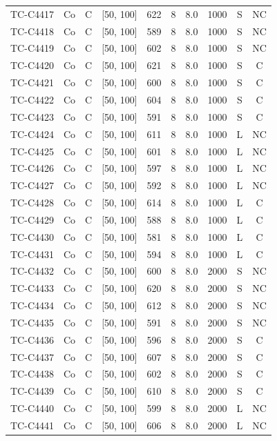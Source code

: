 \begin{longtable}{lccccccccc}
TC-C4417 & Co & C & [50, 100] & 622 & 8 & 8.0 & 1000 & S & NC \\
TC-C4418 & Co & C & [50, 100] & 589 & 8 & 8.0 & 1000 & S & NC \\
TC-C4419 & Co & C & [50, 100] & 602 & 8 & 8.0 & 1000 & S & NC \\
TC-C4420 & Co & C & [50, 100] & 621 & 8 & 8.0 & 1000 & S & C \\
TC-C4421 & Co & C & [50, 100] & 600 & 8 & 8.0 & 1000 & S & C \\
TC-C4422 & Co & C & [50, 100] & 604 & 8 & 8.0 & 1000 & S & C \\
TC-C4423 & Co & C & [50, 100] & 591 & 8 & 8.0 & 1000 & S & C \\
TC-C4424 & Co & C & [50, 100] & 611 & 8 & 8.0 & 1000 & L & NC \\
TC-C4425 & Co & C & [50, 100] & 601 & 8 & 8.0 & 1000 & L & NC \\
TC-C4426 & Co & C & [50, 100] & 597 & 8 & 8.0 & 1000 & L & NC \\
TC-C4427 & Co & C & [50, 100] & 592 & 8 & 8.0 & 1000 & L & NC \\
TC-C4428 & Co & C & [50, 100] & 614 & 8 & 8.0 & 1000 & L & C \\
TC-C4429 & Co & C & [50, 100] & 588 & 8 & 8.0 & 1000 & L & C \\
TC-C4430 & Co & C & [50, 100] & 581 & 8 & 8.0 & 1000 & L & C \\
TC-C4431 & Co & C & [50, 100] & 594 & 8 & 8.0 & 1000 & L & C \\
TC-C4432 & Co & C & [50, 100] & 600 & 8 & 8.0 & 2000 & S & NC \\
TC-C4433 & Co & C & [50, 100] & 620 & 8 & 8.0 & 2000 & S & NC \\
TC-C4434 & Co & C & [50, 100] & 612 & 8 & 8.0 & 2000 & S & NC \\
TC-C4435 & Co & C & [50, 100] & 591 & 8 & 8.0 & 2000 & S & NC \\
TC-C4436 & Co & C & [50, 100] & 596 & 8 & 8.0 & 2000 & S & C \\
TC-C4437 & Co & C & [50, 100] & 607 & 8 & 8.0 & 2000 & S & C \\
TC-C4438 & Co & C & [50, 100] & 602 & 8 & 8.0 & 2000 & S & C \\
TC-C4439 & Co & C & [50, 100] & 610 & 8 & 8.0 & 2000 & S & C \\
TC-C4440 & Co & C & [50, 100] & 599 & 8 & 8.0 & 2000 & L & NC \\
TC-C4441 & Co & C & [50, 100] & 606 & 8 & 8.0 & 2000 & L & NC \\

\end{longtable}

